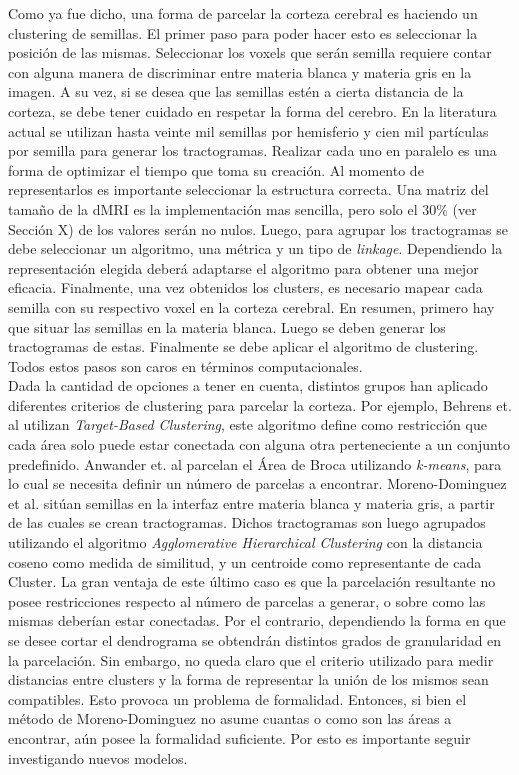 Como ya fue dicho, una forma de parcelar la corteza cerebral es haciendo un 
clustering de semillas.  El primer paso para poder hacer esto es seleccionar
la posici\'on de las mismas. Seleccionar los voxels que ser\'an semilla requiere
contar con alguna manera de discriminar entre materia blanca y materia gris en
la imagen. A su vez, si se desea que las semillas est\'en a cierta distancia de
la corteza, se debe tener cuidado en respetar la forma del cerebro. En la
literatura actual se utilizan hasta veinte mil semillas por hemisferio
\cite{Moreno-Dominguez2014} y cien mil part\'iculas por semilla \cite{Anwander2006}
para generar los tractogramas. Realizar cada uno en paralelo es una forma de 
optimizar el tiempo que toma su creaci\'on. Al momento de representarlos es 
importante seleccionar la estructura correcta. Una matriz del tama\~no de la dMRI
es la implementaci\'on mas sencilla, pero solo el 30\% (ver Secci\'on X) de los
valores ser\'an no nulos. Luego, para agrupar los tractogramas se debe seleccionar
un algoritmo, una m\'etrica y un tipo de \textit{linkage}. Dependiendo la 
representaci\'on elegida deber\'a adaptarse el algoritmo para obtener una mejor
eficacia. Finalmente, una vez obtenidos los clusters, es necesario mapear cada
semilla con su respectivo voxel en la corteza cerebral. En resumen, primero hay
que situar las semillas en la materia blanca. Luego se deben generar los 
tractogramas de estas. Finalmente se debe aplicar el algoritmo de clustering.
Todos estos pasos son caros en t\'erminos computacionales. \\

Dada la cantidad de opciones a tener en cuenta, distintos grupos han aplicado
diferentes criterios de clustering para parcelar la corteza. Por ejemplo, Behrens
et. al \cite{Behrens2003} utilizan \textit{Target-Based Clustering}, este algoritmo
define como restricci\'on que cada \'area solo puede estar conectada con alguna
otra perteneciente a un conjunto predefinido. Anwander et. al \cite{Anwander2006} 
parcelan el \'Area de Broca utilizando \textit{k-means}, para lo cual se necesita
definir un n\'umero de parcelas a encontrar. Moreno-Dominguez et al. 
\cite{Moreno-Dominguez2014} sit\'uan semillas en la interfaz entre materia blanca
y materia gris, a partir de las cuales se crean tractogramas. Dichos tractogramas
son luego agrupados utilizando el algoritmo \textit{Agglomerative Hierarchical
Clustering} con la distancia coseno como medida de similitud, y un centroide como
representante de cada Cluster. La gran ventaja de este \'ultimo caso es que la
parcelaci\'on resultante no posee restricciones respecto al n\'umero de parcelas
a generar, o sobre como las mismas deber\'ian estar conectadas. Por el contrario,
dependiendo la forma en que se desee cortar el dendrograma se obtendr\'an
distintos grados de granularidad en la parcelaci\'on. Sin embargo, no queda claro
que el criterio utilizado para medir distancias entre clusters y la forma de
representar la uni\'on de los mismos sean compatibles. Esto provoca un problema 
de formalidad. Entonces, si bien el m\'etodo de Moreno-Dominguez no asume 
cuantas o como son las \'areas a encontrar, a\'un posee la formalidad suficiente.
Por esto es importante seguir investigando nuevos modelos.  \\

